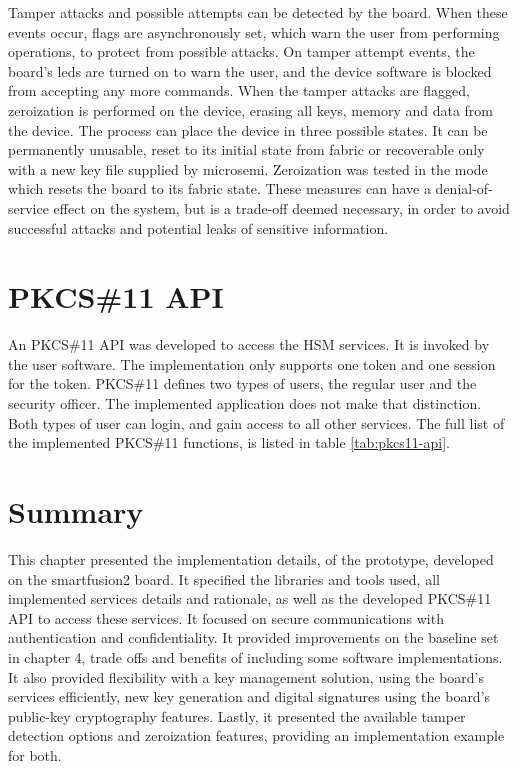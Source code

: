 Tamper attacks and possible attempts can be detected by the board. When these events occur, flags are asynchronously set, which warn the user from performing operations, to protect from possible attacks.
On tamper attempt events, the board's leds are turned on to warn the user, and the device software is blocked from accepting any more commands.
When the tamper attacks are flagged, zeroization is performed on the device, erasing all keys, memory and data from the device.
The process can place the device in three possible states. It can be permanently unusable, reset to its initial state from fabric or recoverable only with a new key file supplied by microsemi. Zeroization was tested in the mode which resets the board to its fabric state.
These measures can have a denial-of-service effect on the system, but is a trade-off deemed necessary, in order to avoid successful attacks and potential leaks of sensitive information.

\section{PKCS\#11 API}\label{chap:implementation:app:pkcs}

An PKCS\#11 API was developed to access the HSM services. It is invoked by the user software.
The implementation only supports one token and one session for the token.
PKCS\#11 defines two types of users, the regular user and the security officer. The implemented application does not make that distinction. Both types of user can login, and gain access to all other services.
The full list of the implemented PKCS\#11 functions, is listed in table \ref{tab:pkcs11-api}.

\section*{Summary}\label{chap:implementation:summary}

This chapter presented the implementation details, of the prototype, developed on the smartfusion2 board. It specified the libraries and tools used, all implemented services details and rationale, as well as the developed PKCS\#11 API to access these services. It focused on secure communications with authentication and confidentiality. It provided improvements on the baseline set in chapter 4, trade offs and benefits of including some software implementations. It also provided flexibility with a key management solution, using the board's services efficiently, new key generation and digital signatures using the board's public-key cryptography features. Lastly, it presented the available tamper detection options and zeroization features, providing an implementation example for both.

